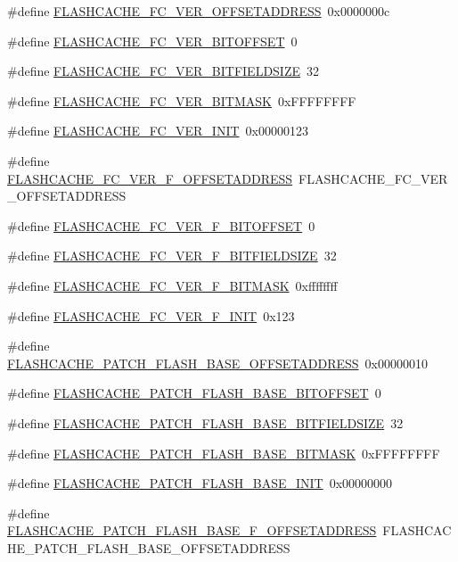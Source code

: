 \begin{DoxyCompactItemize}
\item 
\#define \hyperlink{a00550_a5ce4340afabee0b2a763c46df00222d1}{FLASHCACHE\_\-FC\_\-VER\_\-OFFSETADDRESS}~0x0000000c
\item 
\#define \hyperlink{a00550_a14cdd9e2f33f891b6be8ce5eba7dcc5f}{FLASHCACHE\_\-FC\_\-VER\_\-BITOFFSET}~0
\item 
\#define \hyperlink{a00550_af94b164324bf3884fd86d2f70cc5781c}{FLASHCACHE\_\-FC\_\-VER\_\-BITFIELDSIZE}~32
\item 
\#define \hyperlink{a00550_aa7b375ec00dda93cbda9540292d87bf2}{FLASHCACHE\_\-FC\_\-VER\_\-BITMASK}~0xFFFFFFFF
\item 
\#define \hyperlink{a00550_aba174497e1ea25585509c1e507a6c2f1}{FLASHCACHE\_\-FC\_\-VER\_\-INIT}~0x00000123
\item 
\#define \hyperlink{a00550_a9a5b7432755aadfcc94d2694f6f3d799}{FLASHCACHE\_\-FC\_\-VER\_\-F\_\-OFFSETADDRESS}~FLASHCACHE\_\-FC\_\-VER\_\-OFFSETADDRESS
\item 
\#define \hyperlink{a00550_ac906511b739c9049982667ad43e7143a}{FLASHCACHE\_\-FC\_\-VER\_\-F\_\-BITOFFSET}~0
\item 
\#define \hyperlink{a00550_a88cc357927e7da06f7048f765797d620}{FLASHCACHE\_\-FC\_\-VER\_\-F\_\-BITFIELDSIZE}~32
\item 
\#define \hyperlink{a00550_a12dc88a6e2079daacd581baca6555da0}{FLASHCACHE\_\-FC\_\-VER\_\-F\_\-BITMASK}~0xffffffff
\item 
\#define \hyperlink{a00550_ae7670bce272c18d5bf9dcbdf85dc9f4b}{FLASHCACHE\_\-FC\_\-VER\_\-F\_\-INIT}~0x123
\item 
\#define \hyperlink{a00550_a7972c827747d3e35b472b30c5b36f6fa}{FLASHCACHE\_\-PATCH\_\-FLASH\_\-BASE\_\-OFFSETADDRESS}~0x00000010
\item 
\#define \hyperlink{a00550_aee37b133d7fd0b9a115fb90877daf6a5}{FLASHCACHE\_\-PATCH\_\-FLASH\_\-BASE\_\-BITOFFSET}~0
\item 
\#define \hyperlink{a00550_a5a250e868d59e7f2d10863f4efa0c547}{FLASHCACHE\_\-PATCH\_\-FLASH\_\-BASE\_\-BITFIELDSIZE}~32
\item 
\#define \hyperlink{a00550_a2371cc786bd46f3e8e82bce13c076d3d}{FLASHCACHE\_\-PATCH\_\-FLASH\_\-BASE\_\-BITMASK}~0xFFFFFFFF
\item 
\#define \hyperlink{a00550_ac635c6e3c2a650299494bf9711ddf36a}{FLASHCACHE\_\-PATCH\_\-FLASH\_\-BASE\_\-INIT}~0x00000000
\item 
\#define \hyperlink{a00550_a991e9b77cc30733bdb00f94ec6e5796b}{FLASHCACHE\_\-PATCH\_\-FLASH\_\-BASE\_\-F\_\-OFFSETADDRESS}~FLASHCACHE\_\-PATCH\_\-FLASH\_\-BASE\_\-OFFSETADDRESS

\end{DoxyCompactItemize}
